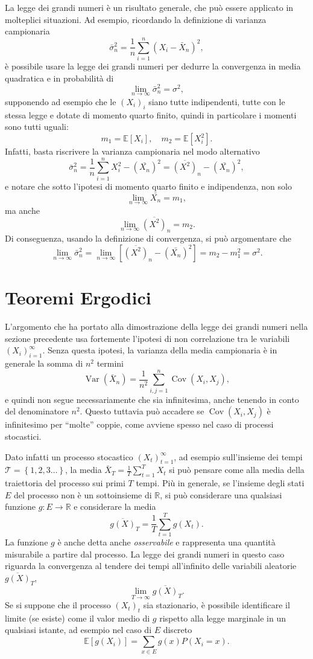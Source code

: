 \documentclass[
  italian,
  letterpaper,
]{book}
\newcommand{\bra}[1]{\left( #1 \right)}
\newcommand{\sqa}[1]{\left[ #1 \right]}
\newcommand{\cur}[1]{\left\{ #1 \right\}}
\newcommand{\R}{\mathbb{R}}
\newcommand{\E}[1]{\mathbb{E}\sqa{#1}}
\newcommand{\Var}[1]{\operatorname{Var}\bra{#1}}
\newcommand{\Cov}[1]{\operatorname{Cov}\bra{#1}}
\theoremstyle{definition}
\theoremstyle{remark}
\begin{document}
La legge dei grandi numeri è un risultato generale, che può essere
applicato in molteplici situazioni. Ad esempio, ricordando la
definizione di varianza campionaria
\[ \bar{\sigma}^2_n = \frac{1}{n} \sum_{i=1}^n (X_i - \bar{X}_n)^2,\] è
possibile usare la legge dei grandi numeri per dedurre la convergenza in
media quadratica e in probabilità di
\[ \lim_{n \to \infty} \bar{\sigma}^2_n = \sigma^2,\] supponendo ad
esempio che le \((X_i)_i\) siano tutte indipendenti, tutte con le stessa
legge e dotate di momento quarto finito, quindi in particolare i momenti
sono tutti uguali: \[ m_1 = \E{X_i}, \quad m_2 = \E{X_i^2}.\] Infatti,
basta riscrivere la varianza campionaria nel modo alternativo
\[ \bar \sigma_n^2 = \frac 1 n \sum_{i=1}^n X_i^2 - (\bar{X_n})^2 = \overline{ (X^2)}_n - (\bar{X_n})^2,\]
e notare che sotto l'ipotesi di momento quarto finito e indipendenza,
non solo \[\lim_{n \to \infty }\bar{X_n} = m_1,\] ma anche
\[ \lim_{n \to \infty} \overline{ (X^2)}_n = m_2.\] Di conseguenza,
usando la definizione di convergenza, si può argomentare che
\[ \lim_{n \to \infty }\bar\sigma_n^2 = \lim_{n \to \infty} \sqa{ \overline{ (X^2)}_n - (\bar{X_n})^2} = m_2 - m_1^2 = \sigma^2.\]

\section{Teoremi Ergodici}\label{sec-ergodic}

L'argomento che ha portato alla dimostrazione della legge dei grandi
numeri nella sezione precedente usa fortemente l'ipotesi di non
correlazione tra le variabili \((X_i)_{i=1}^\infty\). Senza questa
ipotesi, la varianza della media campionaria è in generale la somma di
\(n^2\) termini
\[ \Var{ \bar {X}_n} = \frac{1}{n^2} \sum_{i,j=1}^n\Cov{X_i, X_j},\] e
quindi non segue necessariamente che sia infinitesima, anche tenendo in
conto del denominatore \(n^2\). Questo tuttavia può accadere se
\(\Cov{X_i, X_j}\) è infinitesimo per ``molte'' coppie, come avviene
spesso nel caso di processi stocastici.

Dato infatti un processo stocastico \((X_t)_{t = 1}^\infty\), ad esempio
sull'insieme dei tempi \(\mathcal{T} = \cur{1,2,3\ldots}\), la media
\(\bar{X}_T = \frac 1 T \sum_{t=1}^T X_t\) si può pensare come alla
media della traiettoria del processo sui primi \(T\) tempi. Più in
generale, se l'insieme degli stati \(E\) del processo non è un
sottoinsieme di \(\R\), si può considerare una qualsiasi funzione
\(g:E \to \R\) e considerare la media
\[ \overline{ g(X)}_T = \frac 1 T \sum_{t=1}^T g(X_t).\] La funzione
\(g\) è anche detta anche \emph{osservabile} e rappresenta una quantità
misurabile a partire dal processo. La legge dei grandi numeri in questo
caso riguarda la convergenza al tendere dei tempi all'infinito delle
variabili aleatorie \(\overline{ g(X)}_T\),
\[ \lim_{T \to \infty }\overline{ g(X)}_T. \] Se si suppone che il
processo \((X_t)_t\) sia stazionario, è possibile identificare il limite
(se esiste) come il valor medio di \(g\) rispetto alla legge marginale
in un qualsiasi istante, ad esempio nel caso di \(E\) discreto
\[ \E{g(X_i)} = \sum_{ x \in E} g(x) P(X_i=x).\]
\end{document}
